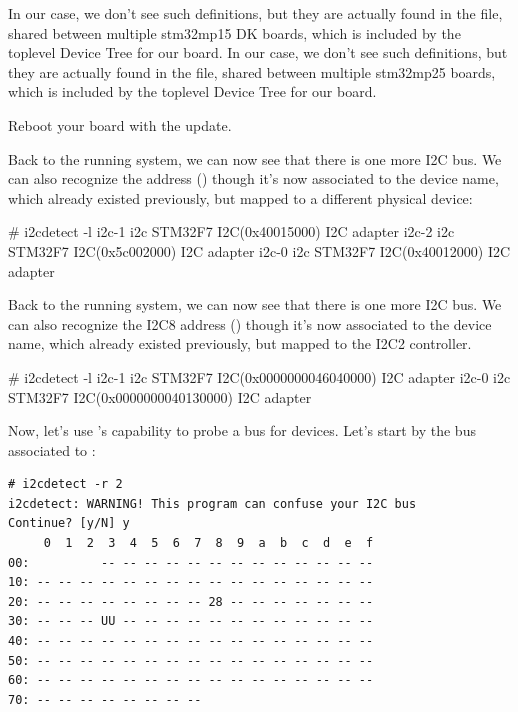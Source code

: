 \if{}
In our case, we don't see such definitions, but they are actually
found in the 
file, shared between multiple stm32mp15 DK boards, which is included
by the toplevel Device Tree for our board.
\fi
\if{}
In our case, we don't see such definitions, but they are actually
found in the 
file, shared between multiple stm32mp25 boards, which is included
by the toplevel Device Tree for our board.
\fi

Reboot your board with the update.

\if{}
Back to the running system, we can now see that there is one more
I2C bus. We can also recognize the \busname address ()
though it's now associated to the  device name, which
already existed previously, but mapped to a different physical device:

\begin{bashinput}
# i2cdetect -l
i2c-1	i2c             STM32F7 I2C(0x40015000)                 I2C adapter
i2c-2	i2c             STM32F7 I2C(0x5c002000)                 I2C adapter
i2c-0	i2c             STM32F7 I2C(0x40012000)                 I2C adapter
\end{bashinput}
\fi
\if{}
Back to the running system, we can now see that there is one more
I2C bus. We can also recognize the I2C8 address ()
though it's now associated to the  device name, which
already existed previously, but mapped to the I2C2 controller.

\begin{bashinput}
# i2cdetect -l
i2c-1	i2c       	STM32F7 I2C(0x0000000046040000) 	I2C adapter
i2c-0	i2c       	STM32F7 I2C(0x0000000040130000) 	I2C adapter
\end{bashinput}
\fi

\if{}
Now, let's use 's capability to probe a bus for devices.
Let's start by the bus associated to :

\begin{verbatim}
# i2cdetect -r 2
i2cdetect: WARNING! This program can confuse your I2C bus
Continue? [y/N] y
     0  1  2  3  4  5  6  7  8  9  a  b  c  d  e  f
00:          -- -- -- -- -- -- -- -- -- -- -- -- --
10: -- -- -- -- -- -- -- -- -- -- -- -- -- -- -- --
20: -- -- -- -- -- -- -- -- 28 -- -- -- -- -- -- --
30: -- -- -- UU -- -- -- -- -- -- -- -- -- -- -- --
40: -- -- -- -- -- -- -- -- -- -- -- -- -- -- -- --
50: -- -- -- -- -- -- -- -- -- -- -- -- -- -- -- --
60: -- -- -- -- -- -- -- -- -- -- -- -- -- -- -- --
70: -- -- -- -- -- -- -- --
\end{verbatim}


